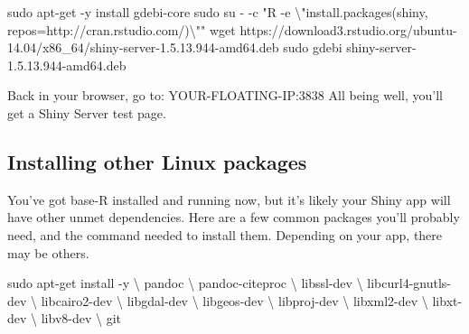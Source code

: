 \documentclass[
]{book}
\newenvironment{Shaded}{\begin{snugshade}}{\end{snugshade}}
\newcommand{\AttributeTok}[1]{\textcolor[rgb]{0.77,0.63,0.00}{#1}}
\newcommand{\DataTypeTok}[1]{\textcolor[rgb]{0.13,0.29,0.53}{#1}}
\newcommand{\FunctionTok}[1]{\textcolor[rgb]{0.00,0.00,0.00}{#1}}
\newcommand{\NormalTok}[1]{#1}
\newcommand{\StringTok}[1]{\textcolor[rgb]{0.31,0.60,0.02}{#1}}
\begin{document}
\begin{Shaded}
\begin{Highlighting}[]

\FunctionTok{sudo}\NormalTok{ apt{-}get }\AttributeTok{{-}y}\NormalTok{ install gdebi{-}core}
\FunctionTok{sudo}\NormalTok{ su }\AttributeTok{{-}} \AttributeTok{{-}c} \StringTok{"R {-}e }\DataTypeTok{\textbackslash{}"}\StringTok{install.packages(\textquotesingle{}shiny\textquotesingle{}, repos=\textquotesingle{}http://cran.rstudio.com/\textquotesingle{})}\DataTypeTok{\textbackslash{}"}\StringTok{"}
\FunctionTok{wget}\NormalTok{ https://download3.rstudio.org/ubuntu{-}14.04/x86\_64/shiny{-}server{-}1.5.13.944{-}amd64.deb}
\FunctionTok{sudo}\NormalTok{ gdebi shiny{-}server{-}1.5.13.944{-}amd64.deb}
\end{Highlighting}
\end{Shaded}

Back in your browser, go to: YOUR-FLOATING-IP:3838
All being well, you'll get a Shiny Server test page.

\hypertarget{installing-other-linux-packages}{%
\subsection{Installing other Linux packages}\label{installing-other-linux-packages}}

You've got base-R installed and running now, but it's likely your Shiny app will have other unmet dependencies. Here are a few common packages you'll probably need, and the command needed to install them. Depending on your app, there may be others.

\begin{Shaded}
\begin{Highlighting}[]

\FunctionTok{sudo}\NormalTok{ apt{-}get install }\AttributeTok{{-}y} \DataTypeTok{\textbackslash{}}
\NormalTok{    pandoc }\DataTypeTok{\textbackslash{}}
\NormalTok{    pandoc{-}citeproc }\DataTypeTok{\textbackslash{}}
\NormalTok{    libssl{-}dev }\DataTypeTok{\textbackslash{}}
\NormalTok{    libcurl4{-}gnutls{-}dev }\DataTypeTok{\textbackslash{}}
\NormalTok{    libcairo2{-}dev }\DataTypeTok{\textbackslash{}}
\NormalTok{    libgdal{-}dev }\DataTypeTok{\textbackslash{}}
\NormalTok{    libgeos{-}dev }\DataTypeTok{\textbackslash{}}
\NormalTok{    libproj{-}dev }\DataTypeTok{\textbackslash{}}
\NormalTok{    libxml2{-}dev }\DataTypeTok{\textbackslash{}}
\NormalTok{    libxt{-}dev }\DataTypeTok{\textbackslash{}}
\NormalTok{    libv8{-}dev }\DataTypeTok{\textbackslash{}}
\NormalTok{    git}
\end{Highlighting}
\end{Shaded}
\end{document}
